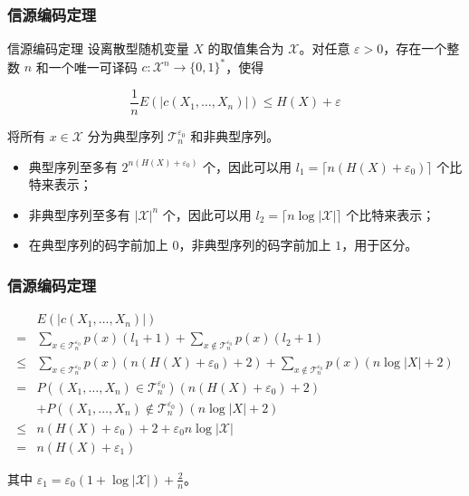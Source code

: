 \documentclass{beamer}
\begin{document}
\begin{frame}
    \frametitle{信源编码定理}

    \begin{block}{信源编码定理}
        设离散型随机变量 $X$ 的取值集合为 $\mathcal{X}$。对任意 $\varepsilon > 0$，存在一个整数 $n$ 和一个唯一可译码 $c: \mathcal{X}^n \rightarrow \{0, 1\}^*$，使得

        \[\frac{1}{n}E(\lvert c(X_1, \dots, X_n)\rvert) \leq H(X) + \varepsilon\]
    \end{block}
    
    将所有 $x\in \mathcal{X}$ 分为典型序列 $\mathcal{T}_n^{\varepsilon_0}$ 和非典型序列。

    \begin{itemize}
        \item 典型序列至多有 $2^{n(H(X) + \varepsilon_0)}$ 个，因此可以用 $l_1 = \lceil n(H(X) + \varepsilon_0)\rceil$ 个比特来表示；
        \item 非典型序列至多有 $\lvert \mathcal{X}\rvert^n$ 个，因此可以用 $l_2 = \lceil n\log \lvert \mathcal{X}\rvert\rceil$ 个比特来表示；
        \item 在典型序列的码字前加上 $0$，非典型序列的码字前加上 $1$，用于区分。
    \end{itemize}

\end{frame}

\begin{frame}
    \frametitle{信源编码定理}

    \[\begin{split}
        & E(\lvert c(X_1, \dots, X_n)\rvert) \\
        = & \sum_{x\in\mathcal{T}_n^{\varepsilon_0}}p(x)(l_1 + 1) + \sum_{x\notin\mathcal{T}_n^{\varepsilon_0}}p(x)(l_2 + 1) \\
        \leq & \sum_{x\in\mathcal{T}_n^{\varepsilon_0}}p(x)(n(H(X) + \varepsilon_0) + 2) + \sum_{x\notin\mathcal{T}_n^{\varepsilon_0}}p(x)(n\log \lvert X\rvert + 2) \\
        = & P((X_1, \dots, X_n) \in \mathcal{T}_n^{\varepsilon_0})(n(H(X) + \varepsilon_0) + 2) \\
        & + P((X_1, \dots, X_n) \notin \mathcal{T}_n^{\varepsilon_0})(n\log \lvert X\rvert + 2) \\
        \leq & n(H(X) + \varepsilon_0) + 2 + \varepsilon_0 n\log\lvert\mathcal{X}\rvert \\
        = & n(H(X) + \varepsilon_1)
    \end{split}\]

    其中 $\varepsilon_1 = \varepsilon_0(1 + \log\lvert\mathcal{X}\rvert) + \frac{2}{n}$。

\end{frame}
\end{document}
